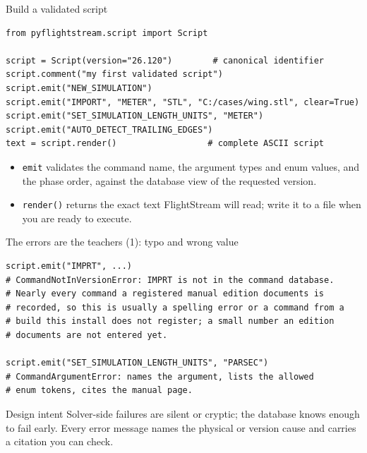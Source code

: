 \documentclass[aspectratio=169,10pt]{beamer}
\newcommand{\code}[1]{\texttt{\small #1}}
\begin{document}
\begin{frame}[fragile]{Build a validated script}
\begin{lstlisting}
from pyflightstream.script import Script

script = Script(version="26.120")        # canonical identifier
script.comment("my first validated script")
script.emit("NEW_SIMULATION")
script.emit("IMPORT", "METER", "STL", "C:/cases/wing.stl", clear=True)
script.emit("SET_SIMULATION_LENGTH_UNITS", "METER")
script.emit("AUTO_DETECT_TRAILING_EDGES")
text = script.render()                  # complete ASCII script
\end{lstlisting}
  \begin{itemize}
    \item \code{emit} validates the command name, the argument types and enum values, and the phase order, against the database view of the requested version.
    \item \code{render()} returns the exact text FlightStream will read; write it to a file when you are ready to execute.
  \end{itemize}
\end{frame}

\begin{frame}[fragile]{The errors are the teachers (1): typo and wrong value}
\begin{lstlisting}
script.emit("IMPRT", ...)
# CommandNotInVersionError: IMPRT is not in the command database.
# Nearly every command a registered manual edition documents is
# recorded, so this is usually a spelling error or a command from a
# build this install does not register; a small number an edition
# documents are not entered yet.

script.emit("SET_SIMULATION_LENGTH_UNITS", "PARSEC")
# CommandArgumentError: names the argument, lists the allowed
# enum tokens, cites the manual page.
\end{lstlisting}
  \begin{block}{Design intent}
    Solver-side failures are silent or cryptic; the database knows enough to fail early. Every error message names the physical or version cause and carries a citation you can check.
  \end{block}
\end{frame}
\end{document}
